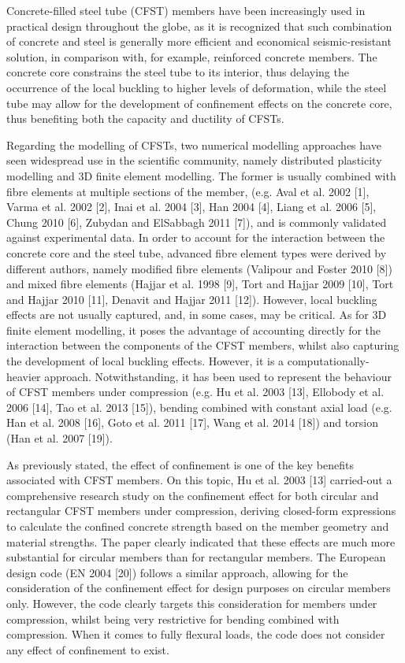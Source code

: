 Concrete-filled steel tube (CFST) members have been increasingly used in practical design throughout the globe, as it is recognized that such combination of concrete and steel is generally more efficient and economical seismic-resistant solution, in comparison with, for example, reinforced concrete members. The concrete core constrains the steel tube to its interior, thus delaying the occurrence of the local buckling to higher levels of deformation, while the steel tube may allow for the development of confinement effects on the concrete core, thus benefiting both the capacity and ductility of CFSTs.

Regarding the modelling of CFSTs, two numerical modelling approaches have seen widespread use in the scientific community, namely distributed plasticity modelling and 3D finite element modelling. The former is usually combined with fibre elements at multiple sections of the member, (e.g. Aval et al. 2002 [1], Varma et al. 2002 [2], Inai et al. 2004 [3], Han 2004 [4], Liang et al. 2006 [5], Chung 2010 [6], Zubydan and ElSabbagh 2011 [7]), and is commonly validated against experimental data. In order to account for the interaction between the concrete core and the steel tube, advanced fibre element types were derived by different authors, namely modified fibre elements (Valipour and Foster 2010 [8]) and mixed fibre elements (Hajjar et al. 1998 [9], Tort and Hajjar 2009 [10], Tort and Hajjar 2010 [11], Denavit and Hajjar 2011 [12]). However, local buckling effects are not usually captured, and, in some cases, may be critical. As for 3D finite element modelling, it poses the advantage of accounting directly for the interaction between the components of the CFST members, whilst also capturing the development of local buckling effects. However, it is a computationally-heavier approach. Notwithstanding, it has been used to represent the behaviour of CFST members under compression (e.g. Hu et al. 2003 [13], Ellobody et al. 2006 [14], Tao et al. 2013 [15]), bending combined with constant axial load (e.g. Han et al. 2008 [16], Goto et al. 2011 [17], Wang et al. 2014 [18]) and torsion (Han et al. 2007 [19]).

As previously stated, the effect of confinement is one of the key benefits associated with CFST members. On this topic, Hu et al. 2003 [13] carried-out a comprehensive research study on the confinement effect for both circular and rectangular CFST members under compression, deriving closed-form expressions to calculate the confined concrete strength based on the member geometry and material strengths. The paper clearly indicated that these effects are much more substantial for circular members than for rectangular members. The European design code (EN 2004 [20]) follows a similar approach, allowing for the consideration of the confinement effect for design purposes on circular members only. However, the code clearly targets this consideration for members under compression, whilst being very restrictive for bending combined with compression. When it comes to fully flexural loads, the code does not consider any effect of confinement to exist.

